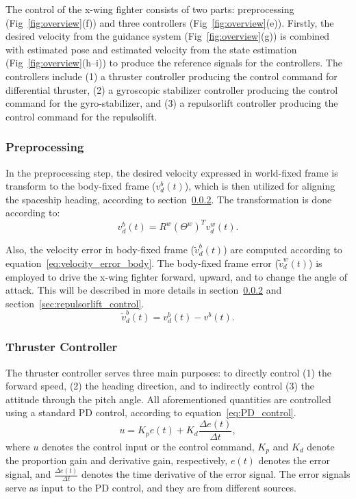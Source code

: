 The control of the x-wing fighter consists of two parts: preprocessing (Fig~\ref{fig:overview}(f)) and three controllers (Fig~\ref{fig:overview}(e)). Firstly, the desired velocity from the guidance system (Fig~\ref{fig:overview}(g)) is combined with estimated pose and estimated velocity from the state estimation (Fig~\ref{fig:overview}(h–i)) to produce the reference signals for the controllers. The controllers include (1) a thruster controller producing the control command for differential thruster, (2) a gyroscopic stabilizer controller producing the control command for the gyro-stabilizer, and (3) a repulsorlift controller producing the control command for the repulsolift.


\subsubsection{Preprocessing}
In the preprocessing step, the desired velocity expressed in world-fixed frame is transform to the body-fixed frame ($v^b_d(t) $), which is then utilized for aligning the spaceship heading, according to section~\ref{sec:thruster_control}. The transformation is done according to:
\begin{equation}
v^b_d(t) = R^w(\Theta^w)^T v^w_d(t).
\label{eq:desired_velocity_body}
\end{equation}

Also, the velocity error in body-fixed frame ($\tilde{v}^b_d(t)$) are computed according to equation~\ref{eq:velocity_error_body}. The body-fixed frame error ($\tilde{v}^w_d(t) $) is employed to drive the x-wing fighter forward, upward, and to change the angle of attack. This will be described in more details in section~\ref{sec:thruster_control} and section~\ref{sec:repulsorlift_control}.
\begin{equation}
\tilde{v}^b_d(t) = v^b_d(t) - v^b(t).
\label{eq:velocity_error_body}
\end{equation}



\subsubsection{Thruster Controller}
\label{sec:thruster_control}
The thruster controller serves three main purposes: to directly control (1) the forward speed, (2) the heading direction, and to indirectly control (3) the attitude through the pitch angle. All aforementioned quantities are controlled using a standard PD control, according to equation~\ref{eq:PD_control}. 
\begin{equation}
u = K_p e(t) + K_d \frac{\Delta e(t)}{ \Delta t},
\label{eq:PD_control}
\end{equation}
where $u$ denotes the control input or the control command, $K_p$ and $K_d$ denote the proportion gain and derivative gain, respectively,  $e(t) $ denotes the error signal, and $\frac{\Delta e(t)}{ \Delta t}$ denotes the time derivative of the error signal. The error signals serve as input to the PD control, and they are from different sources.

